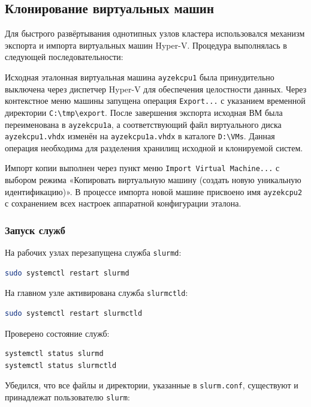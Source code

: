 \documentclass[areaset=advanced]{scrartcl}
\begin{document}
\subsection{Клонирование виртуальных машин}
Для быстрого развёртывания однотипных узлов кластера использовался механизм экспорта и импорта виртуальных машин Hyper-V. Процедура выполнялась в следующей последовательности:

Исходная эталонная виртуальная машина \texttt{ayzekcpu1} была принудительно выключена через диспетчер Hyper-V для обеспечения целостности данных. Через контекстное меню машины запущена операция \texttt{Export...} с указанием временной директории \texttt{C:\textbackslash tmp\textbackslash export}. После завершения экспорта исходная ВМ была переименована в \texttt{ayzekcpu1a}, а соответствующий файл виртуального диска \texttt{ayzekcpu1.vhdx} изменён на \texttt{ayzekcpu1a.vhdx} в каталоге \texttt{D:\textbackslash VMs}. Данная операция необходима для разделения хранилищ исходной и клонируемой систем.

Импорт копии выполнен через пункт меню \texttt{Import Virtual Machine...} с выбором режима «Копировать виртуальную машину (создать новую уникальную идентификацию)». В процессе импорта новой машине присвоено имя \texttt{ayzekcpu2} с сохранением всех настроек аппаратной конфигурации эталона.

\subsubsection{Запуск служб}
На рабочих узлах перезапущена служба \texttt{slurmd}:

\begin{lstlisting}[language=bash]
sudo systemctl restart slurmd
\end{lstlisting}

На главном узле активирована служба \texttt{slurmctld}:

\begin{lstlisting}[language=bash]
sudo systemctl restart slurmctld
\end{lstlisting}

Проверено состояние служб:

\begin{lstlisting}[language=bash]
systemctl status slurmd
systemctl status slurmctld
\end{lstlisting}

Убедился, что все файлы и директории, указанные в \texttt{slurm.conf}, существуют и принадлежат пользователю \texttt{slurm}:
\end{document}

